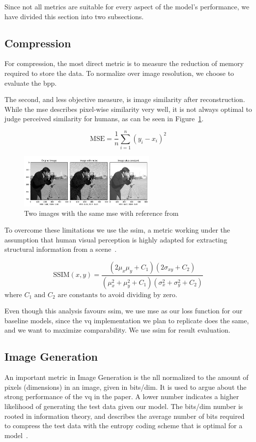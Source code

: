 Since not all metrics are suitable for every aspect of the model's performance, we have divided this section into two subsections.

\subsection{Compression}\label{subsec:compression}
For compression, the most direct metric is to measure the reduction of memory required to
store the data.
To normalize over image resolution, we choose to evaluate the \ac{bpp}.

The second, and less objective measure, is image similarity after reconstruction.
While the \ac{mse} describes pixel-wise similarity very well, it is not
always optimal to judge perceived similarity for humans, as can be seen in Figure~\ref{fig:mse_ssim}.

\[
\text{MSE} = \frac{1}{n} \sum_{i=1}^{n} (y_i - x_i)^2
\]

\begin{figure}[ht]
    \centering
    \includegraphics[width=0.6\textwidth]{images/ssim_mse}
    \caption{Two images with the same \ac{mse} with reference from~\cite{scikit-ssim}}
    \label{fig:mse_ssim}
\end{figure}

To overcome these limitations we use the \ac{ssim}, a metric working under the assumption that human visual
perception is highly adapted for extracting structural information from a scene~\cite{ssim}.

\[
\text{SSIM}(x, y) = \frac{(2\mu_x \mu_y + C_1)(2\sigma_{xy} + C_2)}{(\mu_x^2 + \mu_y^2 + C_1)(\sigma_x^2 + \sigma_y^2 + C_2)}
\]
$\text{where } C_1 \text{ and } C_2 \text{ are constants to avoid dividing by zero.}$


Even though this analysis favours \ac{ssim}, we use \ac{mse} as our loss function for our baseline models,
since the \ac{vq} implementation we plan to replicate does the same, and we want to maximize comparability.
We use \ac{ssim} for result evaluation.

\subsection{Image Generation}\label{subsec:image-generation}
An important metric in Image Generation is the \ac{nll} normalized to the amount of pixels (dimensions) in an image, given in bits/dim.
It is used to argue about the strong performance of the \ac{vq} in the paper.
A lower number indicates a higher likelihood of generating the test data given our model.
The bits/dim number is rooted in information theory, and describes the average number of bits required to
compress the test data with the entropy coding scheme that is optimal for a model~\cite{shannon}.


